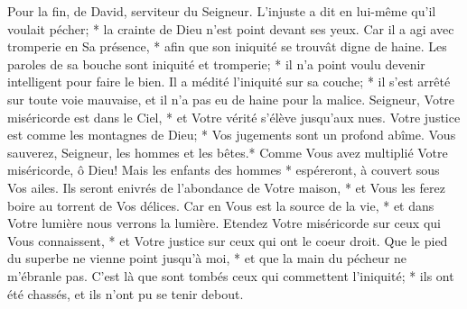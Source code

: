 Pour la fin, de David, serviteur du Seigneur.
L'injuste a dit en lui-même qu'il voulait pécher; * la crainte de Dieu n'est point devant ses yeux.
Car il a agi avec tromperie en Sa présence, * afin que son iniquité se trouvât digne de haine.
Les paroles de sa bouche sont iniquité et tromperie; * il n'a point voulu devenir intelligent pour faire le bien.
Il a médité l'iniquité sur sa couche; * il s'est arrêté sur toute voie mauvaise, et il n'a pas eu de haine pour la malice.
Seigneur, Votre miséricorde est dans le Ciel, * et Votre vérité s'élève jusqu'aux nues.
Votre justice est comme les montagnes de Dieu; * Vos jugements sont un profond abîme. Vous sauverez, Seigneur, les hommes et les bêtes.*
Comme Vous avez multiplié Votre miséricorde, ô Dieu! Mais les enfants des hommes * espéreront, à couvert sous Vos ailes.
Ils seront enivrés de l'abondance de Votre maison, * et Vous les ferez boire au torrent de Vos délices.
Car en Vous est la source de la vie, * et dans Votre lumière nous verrons la lumière.
Etendez Votre miséricorde sur ceux qui Vous connaissent, * et Votre justice sur ceux qui ont le coeur droit.
Que le pied du superbe ne vienne point jusqu'à moi, * et que la main du pécheur ne m'ébranle pas.
C'est là que sont tombés ceux qui commettent l'iniquité; * ils ont été chassés, et ils n'ont pu se tenir debout.

